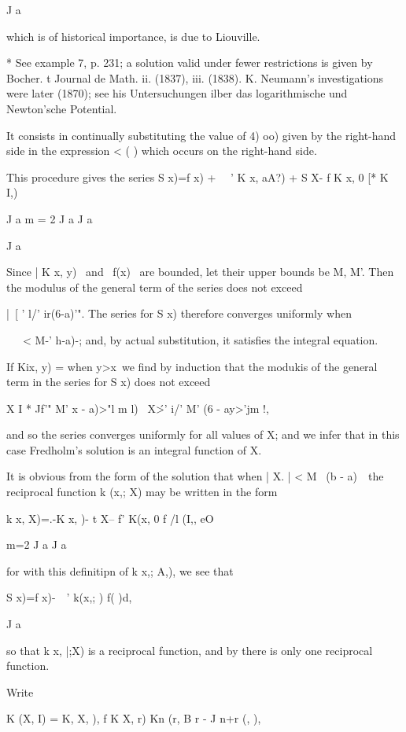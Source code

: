 {J a

which is of historical importance, is due to Liouville.

* See example 7, p. 231; a solution valid under fewer restrictions is
given by Bocher. t Journal de Math. ii. (1837), iii. (1838). K.
Neumann's investigations were later (1870); see his Untersuchungen
ilber das logarithmische und Newton'sche Potential.

%
%

It consists in continually substituting the value of 4) oo) given by
the right-hand side in the expression < ( ) which occurs on the
right-hand side.

This procedure gives the series S x)=f x) + \ \ ' K x, aA?) + S X- f K
x, 0 [* K I,)

J a m = 2 J a J a

J a

Since | K x, y) \ and \ f(x) \ are bounded, let their upper bounds be
M, M'. Then the modulus of the general term of the series does not
exceed

|\ [ ' l/' ir(6-a)'". The series for S x) therefore converges
uniformly when

\ \ \ < M-' h-a)-; and, by actual substitution, it satisfies the
integral equation.

If Kix, y) = when y>x\ we find by induction that the modukis of the
general term in the series for S x) does not exceed

X I * Jf'" M' x - a)>"l m l) \ X\'>' i/' M' (6 - ay>'jm !,

and so the series converges uniformly for all values of X; and we
infer that in this case Fredholm's solution is an integral function of
X.

It is obvious from the form of the solution that when | X. | < M~ (b -
a)~\ the reciprocal function k (x,; X) may be written in the form

k x, X)=.-K x, )- t X-- f' K(x, 0 f /l (I,, eO

m=2 J a J a

for with this definitipn of k x,; A,), we see that

S x)=f x)-\ \ ' k(x,; ) f( )d,

J a

so that k x, |;X) is a reciprocal function, and by there is
only one reciprocal function.

Write

K (X, I) = K, X, ), f K X, r) Kn (r, B r - J n+r (, ),

}
